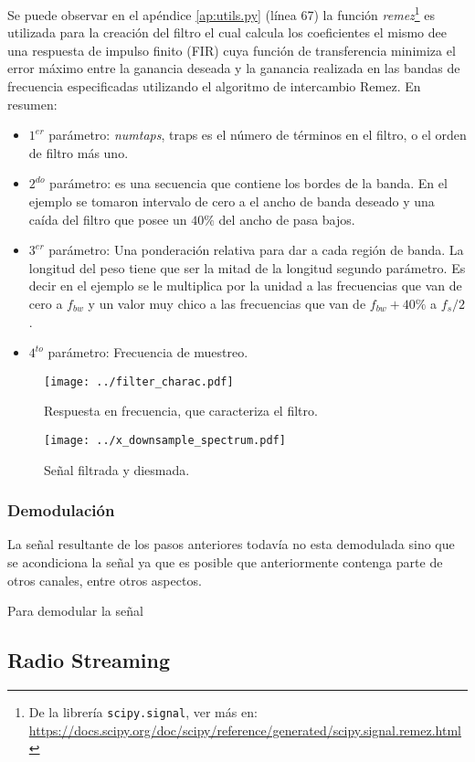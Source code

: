 Se puede observar en el apéndice \ref{ap:utils.py} (línea 67) la función \emph{remez}\footnote{De la librería \texttt{scipy.signal}, ver más en: \url{https://docs.scipy.org/doc/scipy/reference/generated/scipy.signal.remez.html}} es utilizada para la creación del filtro el cual calcula los coeficientes el mismo dee una respuesta de impulso finito (FIR) cuya función de transferencia minimiza el error máximo entre la ganancia deseada y la ganancia realizada en las bandas de frecuencia especificadas utilizando el algoritmo de intercambio Remez.
En resumen:
\begin{itemize}
	\item $1^{er}$ parámetro: \emph{numtaps}, traps es el número de términos en el filtro, o el orden de filtro más uno.
	\item $2^{do}$ parámetro: es una secuencia que contiene los bordes de la banda.
	En el ejemplo se tomaron intervalo de cero a el ancho de banda deseado y una caída del filtro que posee un $40\%$ del ancho de pasa bajos. 
	\item $3^{er}$ parámetro: Una ponderación relativa para dar a cada región de banda. La longitud del peso tiene que ser la mitad de la longitud segundo parámetro.
	Es decir en el ejemplo se le multiplica por la unidad a las frecuencias que van de cero a $f_{bw}$ y un valor muy chico a las frecuencias que van de $f_{bw} + 40\%$ a $f_s/2$.
	\item $4^{to}$ parámetro: Frecuencia de muestreo.
\end{itemize}

\begin{figure}[ht!]
	\centering
	\texttt{[image: ../filter\_charac.pdf]}
	\caption{Respuesta en frecuencia, que caracteriza el filtro.}
	\label{fig:filter_charac}
\end{figure}

\begin{figure}[ht!]
	\centering
	\texttt{[image: ../x\_downsample\_spectrum.pdf]}
	\caption{Señal filtrada y diesmada.}
	\label{fig:x_downsample_spectrum}
\end{figure}

\subsubsection{Demodulación}
La señal resultante de los pasos anteriores todavía no esta demodulada sino que se acondiciona la señal ya que es posible que anteriormente contenga parte de otros canales, entre otros aspectos. 

Para demodular la señal 

\newpage

\subsection{Radio Streaming}